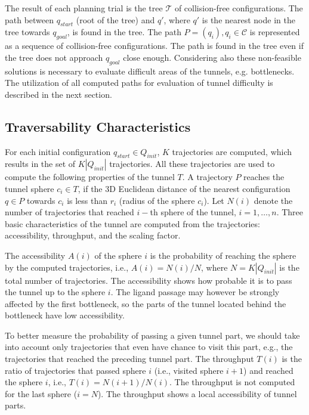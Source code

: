 \documentclass{svmult}
\def\qstart{q_{start}}
\def\qinit{\qstart}
\def\qgoal{q_{goal}}
\def\T{\mathcal{T}}
\def\C{\mathcal{C}}
\def\QI{Q_{init}}
\begin{document}
The result of each planning trial is the tree $\T$ of collision-free configurations.
The path between $\qinit$ (root of the tree) and $q'$, where $q'$ is the nearest node in the tree towards $\qgoal$, is found in the tree.
The path $P=(q_i), q_i \in \C$ is represented as a sequence of collision-free configurations.
The path is found in the tree even if the tree does not approach $\qgoal$ close enough.
Considering also these non-feasible solutions is necessary to evaluate difficult areas of the tunnels, e.g. bottlenecks.
The utilization of all computed paths for evaluation of tunnel difficulty is described in the next section.


\subsection{Traversability Characteristics}

For each initial configuration $\qinit \in \QI$, $K$ trajectories are computed, which results in the set of $K |\QI|$ trajectories.
All these trajectories are used to compute the following properties of the tunnel $T$.
A trajectory $P$ reaches the tunnel sphere $c_i \in T$, if the 3D Euclidean distance of the 
nearest configuration $q \in P$ towards $c_i$ is less than $r_i$ (radius of the sphere $c_i$).
Let $N(i)$ denote the number of trajectories that reached $i-$th sphere of the tunnel, $i=1,\ldots,n$.
Three basic characteristics of the tunnel are computed from the trajectories: accessibility, throughput, and the scaling factor.

The accessibility $A(i)$ of the sphere $i$ is the probability of reaching the sphere by the computed trajectories,
i.e., $A(i)=N(i) / N$, where $N=K|\QI|$ is the total number of trajectories.
The accessibility  shows how probable it is to pass the tunnel up to the sphere $i$.
The  ligand passage may however be strongly affected by the first bottleneck, so the parts of the tunnel located behind
the bottleneck have low accessibility.

To better measure the probability of passing a given tunnel part, we should take into account only trajectories that even have chance
to visit this part, e.g., the trajectories that reached the preceding tunnel part.
The throughput $T(i)$ is the ratio of trajectories that passed sphere $i$ (i.e., visited sphere $i+1$) and reached the sphere $i$,
i.e., $T(i) = N(i+1) / N(i)$. 
The throughput is not computed for the last sphere ($i=N$).
The throughput shows a local accessibility of tunnel parts.
\end{document}
